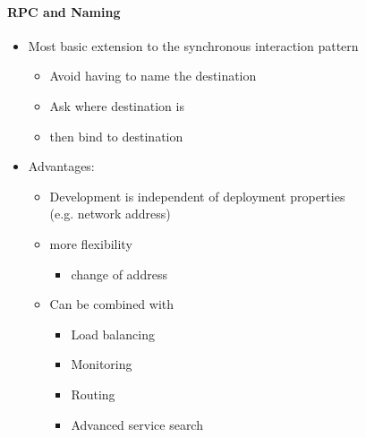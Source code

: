 \paragraph{RPC and Naming}
\begin{itemize}
\item Most basic extension to the synchronous interaction pattern
  \begin{itemize}
  \item Avoid having to name the destination
  \item Ask where destination is
  \item then bind to destination
  \end{itemize}

\item Advantages:
  \begin{itemize}
  \item Development is independent of deployment properties \\
    (e.g. network address)
  \item more flexibility
    \begin{itemize}
    \item change of address
    \end{itemize}
  \item Can be combined with
    \begin{itemize}
    \item Load balancing
    \item Monitoring
    \item Routing
    \item Advanced service search
    \end{itemize}
  \end{itemize}
\end{itemize}

